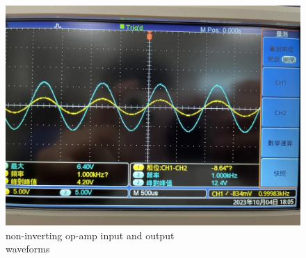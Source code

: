 \documentclass{article}
\begin{document}
\begin{CJK*}{UTF8}{bkai}
\begin{minipage}{0.50\textwidth}
    \begin{figure}[H]
        \begin{center}   
            \includegraphics[scale=0.15]{noninv_1k.jpg}
            \caption{non-inverting op-amp input and output \\waveforms}
        \end{center}
    \end{figure}    
\end{minipage}
\begin{minipage}{0.50\textwidth}
    \begin{figure}[H]
        \begin{center}   

\end{center}
\end{figure}
\end{minipage}
\end{CJK*}
\end{document}
